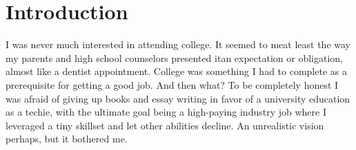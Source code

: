 \documentclass{article}
\begin{document}
\newcommand{\phd}{Ph.D.}
\newcommand{\university}{%
\texttt{<your-college-here>}
}


\newcommand{\sloc}{7.7 million lines}
\newcommand{\numprojects}{43}





\section{Introduction}
I was never much interested in attending college.
It seemed to me\textemdash at least the way my parents and high school counselors presented it\textemdash an expectation or obligation, almost like a dentist appointment. 
College was something I had to complete as a prerequisite for getting a good job.
And then what? 
To be completely honest I was afraid of giving up books and essay writing in favor of a university education as a techie, with the ultimate goal being a high-paying industry job where I leveraged a tiny skillset and let other abilities decline. 
An unrealistic vision perhaps, but it bothered me. 
\end{document}
